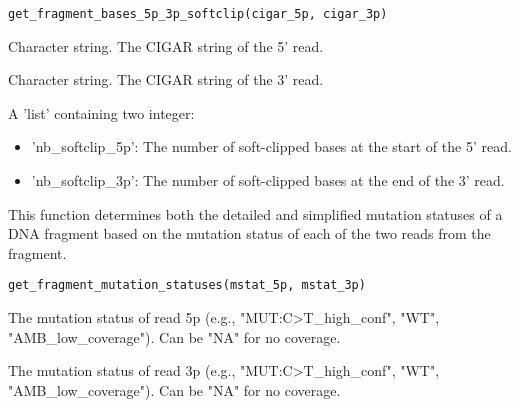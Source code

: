 \documentclass[a4paper]{book}
\begin{document}
%
\begin{Usage}
\begin{verbatim}
get_fragment_bases_5p_3p_softclip(cigar_5p, cigar_3p)
\end{verbatim}
\end{Usage}
%
\begin{Arguments}
\begin{ldescription}
\item[\code{cigar\_5p}] Character string. The CIGAR string of the 5' read.

\item[\code{cigar\_3p}] Character string. The CIGAR string of the 3' read.
\end{ldescription}
\end{Arguments}
%
\begin{Value}
A 'list' containing two integer:
\begin{itemize}

\item{} 'nb\_softclip\_5p': The number of soft-clipped bases at the start of
the 5' read.
\item{} 'nb\_softclip\_3p': The number of soft-clipped bases at the end of
the 3' read.

\end{itemize}

\end{Value}
%
\begin{Description}
This function determines both the detailed and simplified mutation statuses of a DNA
fragment based on the mutation status of each of the two reads from the fragment.
\end{Description}
%
\begin{Usage}
\begin{verbatim}
get_fragment_mutation_statuses(mstat_5p, mstat_3p)
\end{verbatim}
\end{Usage}
%
\begin{Arguments}
\begin{ldescription}
\item[\code{mstat\_5p}] The mutation status of read 5p (e.g., "MUT:C>T\_high\_conf", "WT", "AMB\_low\_coverage").
Can be "NA" for no coverage.

\item[\code{mstat\_3p}] The mutation status of read 3p (e.g., "MUT:C>T\_high\_conf", "WT", "AMB\_low\_coverage").
Can be "NA" for no coverage.
\end{ldescription}
\end{Arguments}
\end{document}
